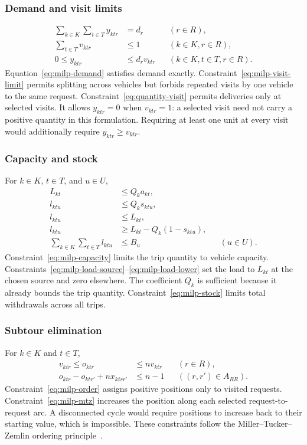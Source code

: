 \subsubsection{Demand and visit limits}
\begin{align}
\sum_{k\in K}\sum_{t\in T}y_{ktr}&=d_r &&(r\in R),\label{eq:milp-demand}\\
\sum_{t\in T}v_{ktr}&\leq1 &&(k\in K,r\in R),\label{eq:milp-visit-limit}\\
0\leq y_{ktr}&\leq d_rv_{ktr} &&(k\in K,t\in T,r\in R).
\label{eq:quantity-visit}
\end{align}
Equation~\eqref{eq:milp-demand} satisfies demand exactly.
Constraint~\eqref{eq:milp-visit-limit} permits splitting across vehicles but
forbids repeated visits by one vehicle to the same request.
Constraint~\eqref{eq:quantity-visit} permits deliveries only at selected visits.
It allows $y_{ktr}=0$ when $v_{ktr}=1$: a selected visit need not carry a
positive quantity in this formulation. Requiring at least one unit at every
visit would additionally require $y_{ktr}\geq v_{ktr}$.

\subsubsection{Capacity and stock}
For $k\in K$, $t\in T$, and $u\in U$,
\begin{align}
L_{kt}&\leq Q_ka_{kt},\label{eq:milp-capacity}\\
l_{ktu}&\leq Q_ks_{ktu},\label{eq:milp-load-source}\\
l_{ktu}&\leq L_{kt},\label{eq:milp-load-upper}\\
l_{ktu}&\geq L_{kt}-Q_k(1-s_{ktu}),\label{eq:milp-load-lower}\\
\sum_{k\in K}\sum_{t\in T}l_{ktu}&\leq B_u &&(u\in U).\label{eq:milp-stock}
\end{align}
Constraint~\eqref{eq:milp-capacity} limits the trip quantity to vehicle
capacity. Constraints~\eqref{eq:milp-load-source}--\eqref{eq:milp-load-lower}
set the load to $L_{kt}$ at the chosen source and zero elsewhere. The coefficient
$Q_k$ is sufficient because it already bounds the trip quantity.
Constraint~\eqref{eq:milp-stock} limits total withdrawals across all trips.

\subsubsection{Subtour elimination}
For $k\in K$ and $t\in T$,
\begin{align}
v_{ktr}\leq o_{ktr}&\leq nv_{ktr} &&(r\in R),\label{eq:milp-order}\\
o_{ktr}-o_{ktr'}+nx_{ktrr'}&\leq n-1
&&((r,r')\in A_{RR}).\label{eq:milp-mtz}
\end{align}
Constraint~\eqref{eq:milp-order} assigns positive positions only to visited
requests. Constraint~\eqref{eq:milp-mtz} increases the position along each
selected request-to-request arc. A disconnected cycle would require positions
to increase back to their starting value, which is impossible. These constraints
follow the Miller--Tucker--Zemlin ordering principle~\cite{miller1960integer}.

